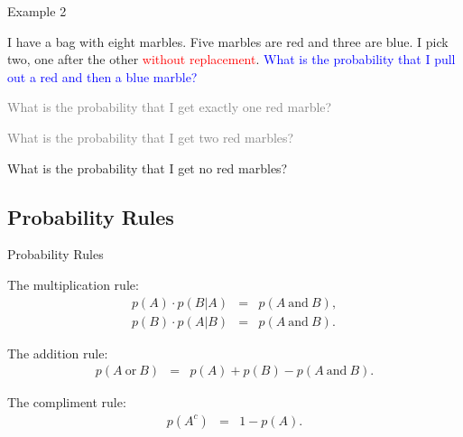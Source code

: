 \begin{frame}{Example 2}

  I have a bag with eight marbles. Five marbles are red and three are
  blue. I pick two, one after the other \textcolor<2->{red}{without
    replacement}. \textcolor<2->{blue}{What is the probability that I pull
    out a red and then a blue marble?}

  \vfill

  {
    \textcolor<4->{gray}{
      What is the probability that I get exactly one red marble?
    }
  }
  
  \vfill

  {
    \textcolor<5->{gray}{
      What is the probability that I get two red marbles?
    }
  }
  
  \vfill

  {
      What is the probability that I get no red marbles?
  }
  
  \vfill


\end{frame}


\subsection{Probability Rules}

\begin{frame}{Probability Rules}

  \begin{definition}
    The multiplication rule:
    \begin{eqnarray*}
      p(A)\cdot p(B|A) & = & p(A \mathrm{~and~} B), \\
      p(B)\cdot p(A|B) & = & p(A \mathrm{~and~} B).
    \end{eqnarray*}

    The addition rule:
    \begin{eqnarray*}
      p(A \mathrm{~or~} B) & = & p(A) + p(B) - p(A \mathrm{~and~} B).
    \end{eqnarray*}

    The compliment rule:
    \begin{eqnarray*}
      p(A^c) & = & 1 - p(A).
    \end{eqnarray*}

  \end{definition}

  \vfill
  
\end{frame}


